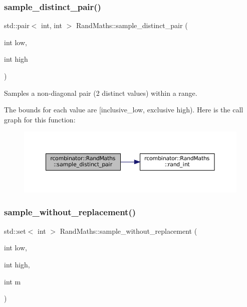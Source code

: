 \subsubsection{\texorpdfstring{sample\+\_\+distinct\+\_\+pair()}{sample\_distinct\_pair()}}
{\footnotesize\ttfamily std\+::pair$<$ int, int $>$ Rand\+Maths\+::sample\+\_\+distinct\+\_\+pair (\begin{DoxyParamCaption}\item[{int}]{low,  }\item[{int}]{high }\end{DoxyParamCaption})}



Samples a non-\/diagonal pair (2 distinct values) within a range. 

The bounds for each value are \mbox{[}inclusive\+\_\+low, exclusive high). Here is the call graph for this function\+:
\nopagebreak
\begin{figure}[H]
\begin{center}
\leavevmode
\includegraphics[width=350pt]{classrcombinator_1_1RandMaths_aaa759efa3059b6793100cb6b6442f26d_cgraph}
\end{center}
\end{figure}
\mbox{\label{classrcombinator_1_1RandMaths_a2c31949c9ac03952cb0006e6a88e3d85}} 
\subsubsection{\texorpdfstring{sample\+\_\+without\+\_\+replacement()}{sample\_without\_replacement()}}
{\footnotesize\ttfamily std\+::set$<$ int $>$ Rand\+Maths\+::sample\+\_\+without\+\_\+replacement (\begin{DoxyParamCaption}\item[{int}]{low,  }\item[{int}]{high,  }\item[{int}]{m }\end{DoxyParamCaption})}



